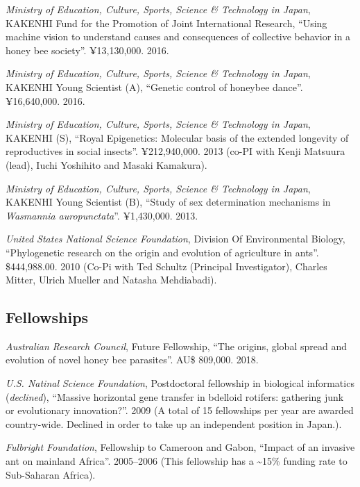 \documentclass[11pt]{article}
\begin{document}
\ind \textit{Ministry of Education, Culture, Sports, Science \& Technology in Japan}, KAKENHI Fund for the Promotion of Joint International Research, ``Using machine vision to understand causes and consequences of collective
behavior in a honey bee society''.  ¥13,130,000. 2016.


\ind \textit{Ministry of Education, Culture, Sports, Science \& Technology in Japan}, KAKENHI Young Scientist (A), ``Genetic control of honeybee dance''.  ¥16,640,000. 2016.


\ind \textit{Ministry of Education, Culture, Sports, Science \& Technology in Japan}, KAKENHI (S), ``Royal Epigenetics: Molecular basis of the extended longevity of
reproductives in social insects''.  ¥212,940,000. 2013 (co-PI with Kenji Matsuura (lead), Iuchi Yoshihito and Masaki Kamakura).


\ind \textit{Ministry of Education, Culture, Sports, Science \& Technology in Japan}, KAKENHI Young Scientist (B), ``Study of sex determination mechanisms in \textit{Wasmannia auropunctata}''.  ¥1,430,000. 2013.


\ind \textit{United States National Science Foundation}, Division Of Environmental Biology, ``Phylogenetic research on the origin and evolution of agriculture in ants''.  \$444,988.00. 2010 (Co-Pi with Ted Schultz (Principal Investigator), Charles Mitter, Ulrich
Mueller and Natasha Mehdiabadi).






\subsection{Fellowships}

\ind \textit{Australian Research Council}, Future Fellowship, ``The origins, global spread and evolution of novel honey bee parasites''.  AU\$ 809,000. 2018.









\ind \textit{U.S. Natinal Science Foundation}, Postdoctoral fellowship in biological informatics (\textit{declined}), ``Massive horizontal gene transfer in bdelloid rotifers: gathering junk or
evolutionary innovation?''.  2009 (A total of 15 fellowships per year are awarded country-wide. Declined in
order to take up an independent position in Japan.).


\ind \textit{Fulbright Foundation}, Fellowship to Cameroon and Gabon, ``Impact of an invasive ant on mainland Africa''.  2005--2006 (This fellowship has a \textasciitilde{}15\% funding rate to Sub-Saharan
Africa).
\end{document}
